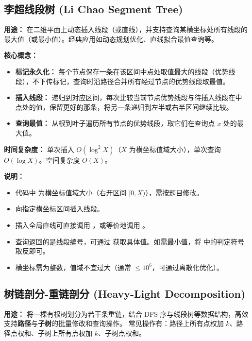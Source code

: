 \subsection{李超线段树 (Li Chao Segment Tree)}

\textbf{用途：}
在二维平面上动态插入线段（或直线），并支持查询某横坐标处所有线段的最大值（或最小值）。经典应用如动态规划优化、直线拟合最值查询等。

\textbf{核心概念：}
\begin{itemize}
  \item \textbf{标记永久化：} 每个节点保存一条在该区间中点处取值最大的线段（优势线段），不下传标记，查询时沿路径合并所有经过节点的优势线段取最值。
  \item \textbf{插入线段：} 递归到对应区间，每次比较当前节点优势线段与待插入线段在中点处的值，保留更好的那条，将另一条递归到左半或右半区间继续比较。
  \item \textbf{查询最值：} 从根到叶子遍历所有节点的优势线段，取它们在查询点 $x$ 处的最大值。
\end{itemize}

\textbf{时间复杂度：}
单次插入 $O(\log^2 X)$（$X$ 为横坐标值域大小），单次查询 $O(\log X)$。空间复杂度 $O(X)$。



\textbf{说明：}
\begin{itemize}
  \item 代码中  为横坐标值域大小（右开区间 $[0, X)$），需按题目修改。
  \item {} 向指定横坐标区间插入线段。
  \item 插入全局直线可直接调用 ，或等价地调用 。
  \item 查询返回的是线段编号，可通过  获取具体值。如需最小值，将  中的判定符号取反即可。
  \item 横坐标需为整数，值域不宜过大（通常 $\le 10^6$，可通过离散化优化）。
\end{itemize}

\subsection{树链剖分-重链剖分 (Heavy-Light Decomposition)}

\textbf{用途：}
将一棵有根树划分为若干条重链，结合 DFS 序与线段树等数据结构，高效支持\textbf{路径}与\textbf{子树}的批量修改和查询操作。
常见操作有：路径上所有点权加 $k$、路径点权和、子树上所有点权加 $k$、子树点权和。

